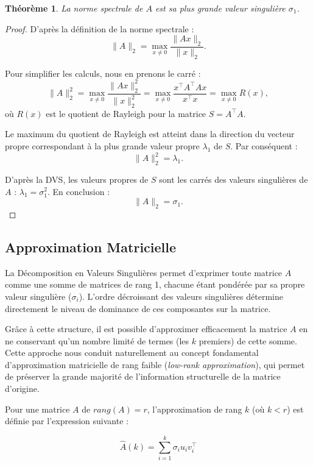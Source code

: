 \documentclass[12pt]{report}
\newtheorem{theorem}{Th\'{e}or\`{e}me}
\begin{document}
\begin{theorem}
    La norme spectrale de $A$ est sa plus grande valeur singulière $\sigma_1$.
\end{theorem}

\begin{proof}
    D'après la définition de la norme spectrale :
    $$ \|A\|_2 = \max_{x \neq 0} \frac{\|Ax\|_2}{\|x\|_2}. $$

    \noindent Pour simplifier les calculs, nous en prenons le carré :
    $$ \|A\|_2^2 = \max_{x \neq 0} \frac{\|Ax\|_2^2}{\|x\|_2^2} = \max_{x \neq 0} \frac{x^{\top} A^{\top} A x}{x^{\top} x} = \max_{x \neq 0} R(x), $$
    où $R(x)$ est le quotient de Rayleigh pour la matrice $S = A^{\top} A$.

    \noindent Le maximum du quotient de Rayleigh est atteint dans la direction du vecteur propre correspondant à la plus grande valeur propre $\lambda_1$ de $S$. Par conséquent :
    $$ \|A\|_2^2 = \lambda_1. $$

    \noindent D'après la DVS, les valeurs propres de $S$ sont les carrés des valeurs singulières de $A$ : $\lambda_1 = \sigma_1^2$. En conclusion :
    $$ \|A\|_2 = \sigma_1. $$
\end{proof}
\clearpage

\subsection*{Approximation Matricielle}
La Décomposition en Valeurs Singulières permet d'exprimer toute matrice $A$ comme une somme de matrices de rang 1, chacune étant pondérée par sa propre valeur singulière ($\sigma_i$). L'ordre décroissant des valeurs singulières détermine directement le niveau de dominance de ces composantes sur la matrice.

Grâce à cette structure, il est possible d'approximer efficacement la matrice $A$ en ne conservant qu'un nombre limité de termes (les $k$ premiers) de cette somme. Cette approche nous conduit naturellement au concept fondamental d'approximation matricielle de rang faible (\textit{low-rank approximation}), qui permet de préserver la grande majorité de l'information structurelle de la matrice d'origine.

Pour une matrice $A$ de ${rang}(A) = r$, l'approximation de rang $k$ (où $k < r$) est définie par l'expression suivante :

\begin{equation}
    \widehat{A}(k) = \sum_{i=1}^{k} \sigma_i u_i v_i^{\top}
\end{equation}
\end{document}
